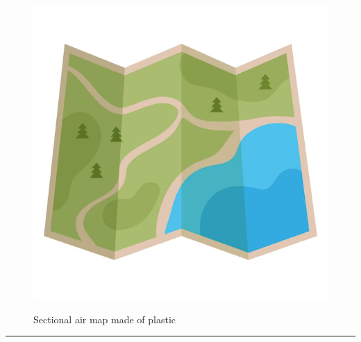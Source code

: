 \documentclass{article}
\begin{document}
    \begin{figure}[H]
        \centering
        \begin{minipage}{0.25\textwidth}
            \centering
            \includegraphics[width=\textwidth]{../SurvivalItemImages/map}
        \end{minipage}\hfill
        \begin{minipage}{0.7\textwidth}
            \centering
            \Large Sectional air map made of plastic
        \end{minipage}
    \end{figure}
    \vspace{-0.8em}
    \noindent\rule{\textwidth}{0.4pt}
            
\end{document}
